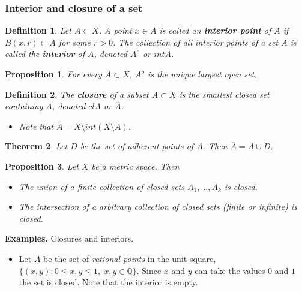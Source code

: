 \documentclass[two column]{article}
\newtheorem{theorem}{Theorem}[subsection]
\newtheorem{proposition}[theorem]{Proposition}
\newtheorem{definition}{Definition}[subsection]
\begin{document}
\subsubsection{Interior and closure of a set}

\begin{definition}
Let $A \subset X$. A point $x \in A$ is called an {\bf interior point} of $A$ if $B(x,r) \subset A$ for some $r > 0$. The collection of all interior points of a set $A$ is called the {\bf interior} of $A$, denoted $A^{o}$ or $intA$. \\
\end{definition}

\begin{proposition}
For every $A \subset X$, $A^{o}$ is the unique largest open set. \\
\end{proposition}

\begin{definition}
The {\bf closure} of a subset $A \subset X$ is the smallest closed set containing $A$, denoted $clA$ or $\overline{A}$. 
\begin{itemize}
\item Note that $\overline{A} = X \setminus int(X \setminus A)$.\\
\end{itemize}
\end{definition}

\begin{theorem}
Let $D$ be the set of adherent points of $A$. Then $\overline{A} = A \cup D$. \\
\end{theorem}

\begin{proposition}
Let $X$ be a metric space. Then
\begin{itemize}
\item The union of a finite collection of closed sets $A_{1}, \dots, A_{k}$ is closed.
\item The intersection of a arbitrary collection of closed sets (finite or infinite) is closed. \\ 
\end{itemize}
\end{proposition}

{\bf Examples.} Closures and interiors.
\begin{itemize}
\item Let $A$ be the set of \emph{rational points} in the unit square, $\{ (x,y): 0 \leq x,y \leq 1, \; x,y \in \mathbb{Q} \}$. Since $x$ and $y$ can take the values $0$ and $1$ the set is closed. Note that the interior is empty. \\
\end{itemize}
\end{document}
